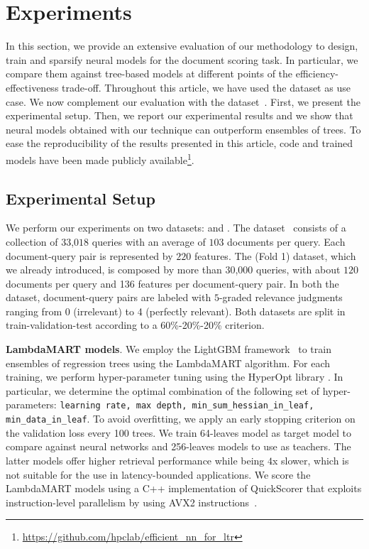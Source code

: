 
\section{Experiments}
\label{sec:experiments}
In this section, we provide an extensive evaluation of our methodology to design, train and sparsify neural models for the document scoring task. In particular, we compare them against tree-based models at different points of the efficiency-effectiveness trade-off. Throughout this article, we have used the \msn dataset as use case. We now complement our evaluation with the \istella dataset~\cite{dato2016fast}. 
First, we present the experimental setup. Then, we report our experimental results and we show that neural models obtained with our technique can outperform ensembles of trees. To ease the reproducibility of the results presented in this article, code and trained models have been made publicly available\footnote{\url{https://github.com/hpclab/efficient_nn_for_ltr}}.


\vspace{-.3cm}
\subsection{Experimental Setup}
\label{subsec:expsetup}
We perform our experiments on two datasets: \istella and \msn. The \istella dataset~\cite{dato2016fast} consists of a collection of $33$,$018$ queries with an average of $103$ documents per query. Each document-query pair is represented by $220$ features. The \msn (Fold 1) dataset, which we already introduced, is composed by more than $30$,$000$ queries, with about $120$ documents per query and 136 features per document-query pair. In both the dataset, document-query pairs are labeled with $5$-graded relevance judgments ranging from 0 (irrelevant) to 4 (perfectly relevant).
Both datasets are split in train-validation-test according to a 60\%-20\%-20\% criterion. 

\smallskip
\noindent \textbf{LambdaMART models}. We employ the LightGBM framework~\cite{NIPS2017_6907} to train ensembles of regression trees using the LambdaMART algorithm. For each training, we perform hyper-parameter tuning using the HyperOpt library \cite{bergstra2013making}.
In particular, we determine the optimal combination of the following set of hyper-parameters: \texttt{learning rate, max depth, min\_sum\_hessian\_in\_leaf, min\_data\_in\_leaf}. 
To avoid overfitting, we apply an early stopping criterion on the validation loss every 100 trees. We train 64-leaves model as target model to compare against neural networks and 256-leaves models to use as teachers. The latter models offer higher retrieval performance while being $4$x slower, which is not suitable for the use in latency-bounded applications. We score the LambdaMART models using a C++ implementation of QuickScorer that exploits instruction-level parallelism by using AVX2 instructions~\cite{8035185}.

